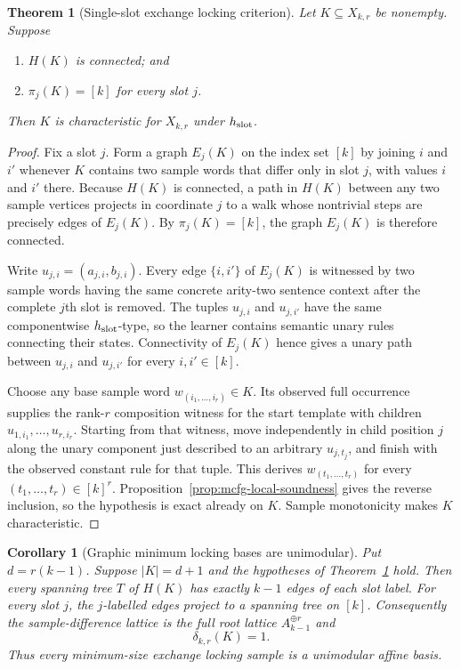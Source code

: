 \documentclass[11pt]{article}
\newtheorem{theorem}[definition]{Theorem}
\newtheorem{corollary}[definition]{Corollary}
\begin{document}
\begin{theorem}[Single-slot exchange locking criterion]
\label{thm:exchange-locking}
Let $K\subseteq X_{k,r}$ be nonempty.  Suppose
\begin{enumerate}[label=\textup{(\roman*)},leftmargin=*]
\item $H(K)$ is connected; and
\item $\pi_j(K)=[k]$ for every slot $j$.
\end{enumerate}
Then $K$ is characteristic for $X_{k,r}$ under $h_{\rm slot}$.
\end{theorem}

\begin{proof}
Fix a slot $j$.  Form a graph $E_j(K)$ on the index set $[k]$ by joining
$i$ and $i'$ whenever $K$ contains two sample words that differ only in slot
$j$, with values $i$ and $i'$ there.  Because $H(K)$ is connected, a path in
$H(K)$ between any two sample vertices projects in coordinate $j$ to a walk
whose nontrivial steps are precisely edges of $E_j(K)$.  By
$\pi_j(K)=[k]$, the graph $E_j(K)$ is therefore connected.

Write $u_{j,i}=(a_{j,i},b_{j,i})$.  Every edge $\{i,i'\}$ of $E_j(K)$ is
witnessed by two sample words having the same concrete arity-two sentence
context after the complete $j$th slot is removed.  The tuples $u_{j,i}$ and
$u_{j,i'}$ have the same componentwise $h_{\rm slot}$-type, so the learner
contains semantic unary rules connecting their states.  Connectivity of
$E_j(K)$ hence gives a unary path between $u_{j,i}$ and $u_{j,i'}$ for every
$i,i'\in[k]$.

Choose any base sample word $w_{(i_1,\ldots,i_r)}\in K$.  Its observed full
occurrence supplies the rank-$r$ composition witness for the start
template with children
$u_{1,i_1},\ldots,u_{r,i_r}$.  Starting from that witness, move independently
in child position $j$ along the unary component just described to an arbitrary
$u_{j,t_j}$, and finish with the observed constant rule for that tuple.  This
derives $w_{(t_1,\ldots,t_r)}$ for every $(t_1,\ldots,t_r)\in[k]^r$.
Proposition~\ref{prop:mcfg-local-soundness} gives the reverse inclusion, so the hypothesis is exact already on
$K$.  Sample monotonicity makes $K$ characteristic.
\end{proof}

\begin{corollary}[Graphic minimum locking bases are unimodular]
\label{cor:exchange-unimodular}
Put $d=r(k-1)$.  Suppose $|K|=d+1$ and the hypotheses of
Theorem~\ref{thm:exchange-locking} hold.  Then every spanning tree $T$ of
$H(K)$ has exactly $k-1$ edges of each slot label.  For every slot $j$, the
$j$-labelled edges project to a spanning tree on $[k]$.  Consequently the
sample-difference lattice is the full root lattice
$A_{k-1}^{\oplus r}$ and
\[
  \delta_{k,r}(K)=1.
\]
Thus every minimum-size exchange locking sample is a unimodular affine basis.
\end{corollary}
\end{document}
